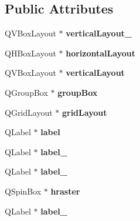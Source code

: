 \subsection*{Public Attributes}
\begin{DoxyCompactItemize}
\item 
\mbox{\label{class_ui___edit_raster_a2e4f1609be60df968b9bc33fe5a4b62f}} 
Q\+V\+Box\+Layout $\ast$ {\bfseries vertical\+Layout\+\_}
\item 
\mbox{\label{class_ui___edit_raster_a4c7fa69948e3b9b7b8a33e8e41155ca2}} 
Q\+H\+Box\+Layout $\ast$ {\bfseries horizontal\+Layout}
\item 
\mbox{\label{class_ui___edit_raster_a4e9c8990938548eda50a3aac8929f550}} 
Q\+V\+Box\+Layout $\ast$ {\bfseries vertical\+Layout}
\item 
\mbox{\label{class_ui___edit_raster_ab38ba0ae37703f317ed8d70aea49d4c5}} 
Q\+Group\+Box $\ast$ {\bfseries group\+Box}
\item 
\mbox{\label{class_ui___edit_raster_acb0a1a383e2ffa3bb908f473ea9a5f2a}} 
Q\+Grid\+Layout $\ast$ {\bfseries grid\+Layout}
\item 
\mbox{\label{class_ui___edit_raster_a0f8ef006b65ac95acbfa258431173ffe}} 
Q\+Label $\ast$ {\bfseries label}
\item 
\mbox{\label{class_ui___edit_raster_a7b57b37df880992acf76d9f4a0b6c068}} 
Q\+Label $\ast$ {\bfseries label\+\_}
\item 
\mbox{\label{class_ui___edit_raster_a3b5a1a4055f0858ae11b9c1fc3aeaac7}} 
Q\+Label $\ast$ {\bfseries label\+\_}
\item 
\mbox{\label{class_ui___edit_raster_a7478b79c0963b2f55c4e322e20c87bcb}} 
Q\+Spin\+Box $\ast$ {\bfseries hraster}
\item 
\mbox{\label{class_ui___edit_raster_a97a00157099556afb6c4e8a99a406dc7}} 
Q\+Label $\ast$ {\bfseries label\+\_}

\end{DoxyCompactItemize}
